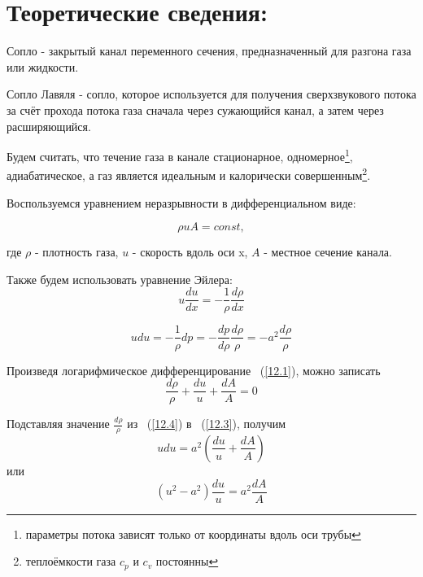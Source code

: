 \documentclass[a4paper]{article}
\begin{document}
\newpage
\section*{Теоретические сведения:}
Сопло - закрытый канал переменного сечения, предназначенный для разгона газа или жидкости. 
\vspace{0.3cm}

Сопло Лавяля - сопло, которое используется для получения сверхзвукового потока за счёт прохода потока газа сначала через сужающийся канал, а затем через расширяющийся.

\par
Будем считать, что течение газа в канале стационарное, одномерное\footnote[1]{параметры потока зависят только от координаты вдоль оси трубы}, адиабатическое, а газ является идеальным и калорически совершенным\footnote[2]{теплоёмкости газа $c_p$ и $c_v$ постоянны}. 
\par
\vspace{0.3cm}
Воспользуемся уравнением неразрывности в дифференциальном виде:

\begin{equation}
    \label{12.1}
    \rho u A = const, 
\end{equation}

где $\rho$ - плотность газа, $u$ - скорость вдоль оси x, $A$ - местное сечение канала. 
\par
\vspace{0.3cm}
Также будем использовать уравнение Эйлера:
\begin{equation}
    \label{12.2}
    u \frac{du}{dx} = - \frac{1}{\rho} \frac{d \rho}{dx}    
\end{equation}



\begin{equation}
    \label{12.3}
    udu= -\frac{1}{\rho}dp = -\frac{dp}{d\rho}\frac{d\rho}{\rho} = -a^2\frac{d\rho}{\rho}
\end{equation}


Произведя логарифмическое дифференцирование ~(\ref{12.1}), можно записать
\begin{equation}
    \label{12.4}
    \frac{d\rho}{\rho} + \frac{du}{u} + \frac{dA}{A} = 0
\end{equation}

Подставляя значение $\frac{d\rho}{\rho}$ из ~(\ref{12.4}) в ~(\ref{12.3}), получим
\begin{equation}
    \label{12.5}
    udu = a^2(\frac{du}{u} + \frac{dA}{A})
\end{equation}
или 
$$(u^2 - a^2)\frac{du}{u} = a^2\frac{dA}{A}$$
\end{document}

